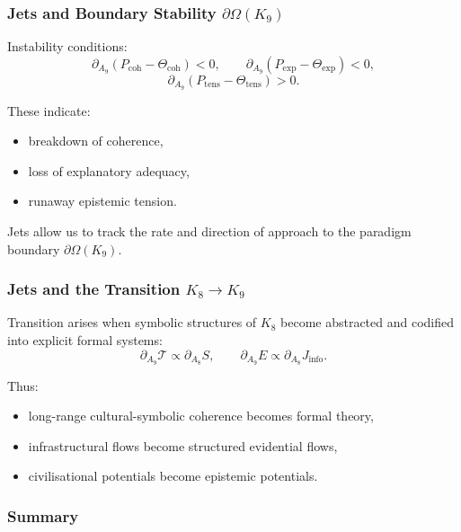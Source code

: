 \subsubsection{Jets and Boundary Stability \texorpdfstring{$\partial\Omega(K_9)$}{\partial\Omega(K_9)}}

Instability conditions:
\[
\partial_{A_9}(P_{\mathrm{coh}}-\Theta_{\mathrm{coh}})<0,\qquad
\partial_{A_9}(P_{\mathrm{exp}}-\Theta_{\mathrm{exp}})<0,
\]
\[
\partial_{A_9}(P_{\mathrm{tens}}-\Theta_{\mathrm{tens}})>0.
\]

These indicate:
\begin{itemize}
    \item breakdown of coherence,
    \item loss of explanatory adequacy,
    \item runaway epistemic tension.
\end{itemize}

Jets allow us to track the rate and direction of approach to the
paradigm boundary $\partial\Omega(K_9)$.


\subsubsection{Jets and the Transition \texorpdfstring{$K_8 \to K_9$}{K_8 \to K_9}}

Transition arises when symbolic structures of $K_8$ become abstracted
and codified into explicit formal systems:
\[
\partial_{A_9}\mathcal{T}
\propto
\partial_{A_8}S,
\qquad
\partial_{A_9}E
\propto
\partial_{A_8}J_{\mathrm{info}}.
\]

Thus:
\begin{itemize}
    \item long-range cultural-symbolic coherence becomes formal theory,
    \item infrastructural flows become structured evidential flows,
    \item civilisational potentials become epistemic potentials.
\end{itemize}


\subsubsection{Summary}


